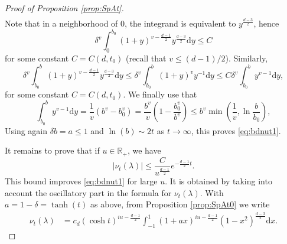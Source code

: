 \documentclass[]{scrartcl}
\newcommand{\R}{\mathds{R}}
\renewcommand{\d}{\mathrm{d}}
\numberwithin{equation}{section}
\numberwithin{figure}{section}
\begin{document}
\begin{proof}[Proof of Proposition \ref{prop:SpAt}]
\begin{align*}
	\end{align*}
	Note that in a neighborhood of $0$, the integrand is equivalent to $y  ^{ \frac{d - 3}{2}}$, hence 
	$$
	\delta^{v}  \int_{0}^{b_0} ( 1 + y )^{v - \frac{d-1}{2}}  y  ^{ \frac{d - 3}{2}}\d y \leq C
	$$
	for some constant $C = C(d,t_0)$ (recall that $v \leq (d-1)/2$). Similarly, 
	$$
	\delta^{v}  \int_{b_0}^{b} ( 1 + y )^{v - \frac{d-1}{2}}  y  ^{ \frac{d - 3}{2}}\d y \leq \delta^{v}  \int_{b_0}^{b} ( 1 + y )^{v} y  ^{ -1} \d y \leq C \delta^{v}  \int_{b_0}^{b} y  ^{v -1} \d y,
	$$
	for some constant $C = C(d,t_0)$.  We finally use that
	$$
	\int_{b_0}^{b} y  ^{v -1} \d y  = \frac{1}{v}(b^v - b_0^v)= \frac{b^v}{v}\left(1 - \frac{b_0^v}{b^v}\right) \leq b^v \min \left( \frac{1}{v} , \ln \frac{b}{b_0}\right),
	$$
	Using again $\delta b = a \leq 1$ and $\ln (b) \sim 2t$ as $t \to \infty$, this proves \eqref{eq:bdnut1}.
	
	It remains to prove that if $u \in \R_+$, we have
	\begin{equation}\label{eq:bdnut2}
		|\nu_t(\lambda)|  \leq   \frac{C}{u^{\frac{d-1}{2}}}   e^{-\frac{d-1}{2}t}. 
	\end{equation}
	This bound improves  \eqref{eq:bdnut1} for large $u$. It is obtained by taking into account the oscillatory part in the formula for $\nu_t(\lambda)$. With $ a = 1- \delta = \tanh (t)$ as above, from Proposition \ref{prop:SpAt0} we write
	\begin{align*}
		\nu_t (\lambda)  &= c_d (\cosh t )^{iu - \frac{d-1}{2}}   \int_{-1}^{1} ( 1+ a x)^{iu - \frac{d-1}{2}} ( 1- x^2)^{ \frac{d - 3}{2}} \d x.
	\end{align*}


\end{proof}
\end{document}
